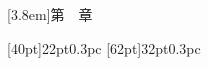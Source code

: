 \titleformat{\section}{\xiaosan\hei}{\thesection}{0.5em}{}
\titlespacing{\section}{0pt}{4.5mm}{4.5mm}
\titleformat{\subsection}{\sihao\hei}{\thesubsection}{0.5em}{}
\titlespacing{\subsection}{0pt}{4mm}{4mm}
\titleformat{\subsubsection}{\xiaosi\hei}{\thesubsubsection}{0.5em}{}
\titlespacing{\subsubsection}{0pt}{0pt}{0pt}
[3.8em]{\hspace{-3.8em}\hei}{第~\thecontentslabel~章~~}{}{\contentspage}


[40pt]{}{22pt}{0.3pc}
[62pt]{}{32pt}{0.3pc}


\makeatletter
\renewcommand*\l@chapter{\@dottedtocline{0}{0em}{4em}}%
\renewcommand*\l@section{\@dottedtocline{1}{1.5em}{1.8em}}
\renewcommand*\l@subsection{\@dottedtocline{2}{2.5em}{2.5em}}


\newcommand{\makeheadrule}{
\rule[7pt]{\textwidth}{0.75pt} \\[-23pt]
\rule{\textwidth}{2.25pt}}
\renewcommand{\headrule}{
    {\if@fancyplain\let\headrulewidth\plainheadrulewidth\fi
   \makeheadrule}}
\pagestyle{fancyplain}



\renewcommand{\chaptermark}[1]{\markboth{第~\thechapter~章\quad #1}{}}

